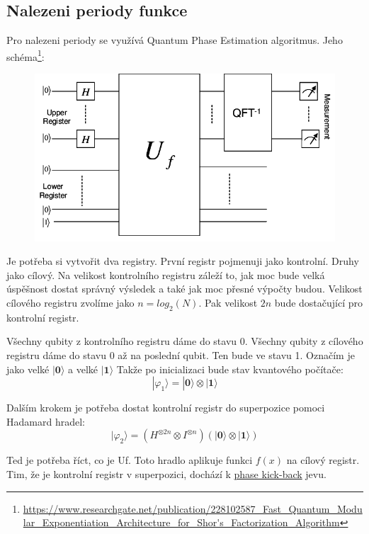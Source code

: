\documentclass[11pt]{article}
\begin{document}
\subsection{Nalezeni periody funkce}
Pro nalezeni periody se využívá Quantum Phase Estimation algoritmus.
Jeho schéma\footnote{\sloppy\url{https://www.researchgate.net/publication/228102587_Fast_Quantum_Modular_Exponentiation_Architecture_for_Shor's_Factorization_Algorithm}}:
\begin{figure}[H]
    \includegraphics[scale=.5]{High-level-diagram-of-Shors-algorithm-Upper-register-consists-of-2n-qubits-and-holds}
    \centering
\end{figure}
\par Je potřeba si vytvořit dva registry. První registr pojmenuji jako kontrolní. Druhy jako cílový.
Na velikost kontrolního registru záleží to, jak moc bude velká úspěšnost dostat správný výsledek a také jak moc přesné výpočty budou.
Velikost cílového registru zvolíme jako $n = log_2(N)$.
Pak velikost $2n$ bude dostačující pro kontrolní registr.
\par Všechny qubity z kontrolního registru dáme do stavu $0$. Všechny qubity z cílového registru dáme do stavu $0$ až na poslední qubit. Ten bude ve stavu 1.
Označím je jako velké $|\textbf{0}\rangle$ a velké $|\textbf{1}\rangle$
Takže po inicializaci bude stav kvantového počítače:
$$|\varphi_1\rangle = |\textbf{0}\rangle\otimes|\textbf{1}\rangle$$
\par Dalším krokem je potřeba dostat kontrolní registr do superpozice pomoci Hadamard hradel:
$$|\varphi_2\rangle = (H^{\otimes 2n}\otimes I^{\otimes n})(|\textbf{0}\rangle\otimes|\textbf{1}\rangle)$$
\par Ted je potřeba říct, co je Uf. Toto hradlo aplikuje funkci $f(x)$ na cílový registr.
Tim, že je kontrolní registr v superpozici, dochází k \hyperref[sec:phase_kickback]{phase kick-back} jevu.
\end{document}
